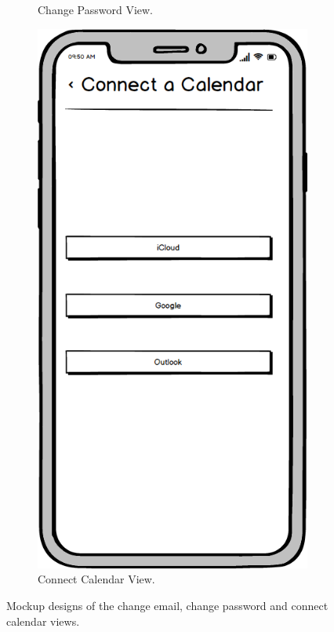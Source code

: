 \begin{figure}
\begin{subfigure}[b]{0.3\textwidth}
        \caption{Change Password View.}
        \label{fig:change_password}
    \end{subfigure}
    \hfill
    \begin{subfigure}[b]{0.3\textwidth}
        \centering
        \includegraphics[width=\textwidth]{./graphics/design/Connect Calendar.png}
        \caption{Connect Calendar View.}
        \label{fig:connect_calendar}
    \end{subfigure}
    
    \caption{Mockup designs of the change email, change password and connect calendar views.}
    \label{fig:changeemail_changepassword_connectcalendar}
\end{figure}

